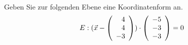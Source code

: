 \begin{aufgabe} ~ \\ 
Geben Sie zur folgenden Ebene eine Koordinatenform an.\[E: (\vec{x} - \Vekd{4}{4}{-3}) \cdot \Vekd{-5}{-3}{-3} = 0 \]\end{aufgabe} 
